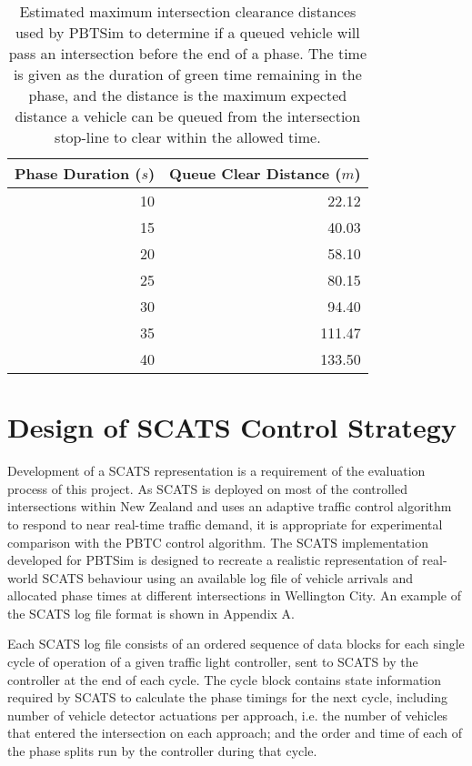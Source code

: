 \begin{table}[]
\begin{center}
\begin{tabular}{rr}
\toprule
Phase Duration ($s$) & Queue Clear Distance ($m$) \\
\midrule
10 & 22.12 \\
15 & 40.03 \\
20 & 58.10 \\
25 & 80.15 \\
30 & 94.40 \\
35 & 111.47 \\
40 & 133.50 \\
\bottomrule
\end{tabular}
\end{center}
\caption{ Estimated maximum intersection clearance distances used by PBTSim to determine if a queued vehicle will pass an intersection before the end of a phase. The time is given as the duration of green time remaining in the phase, and the distance is the maximum expected distance a vehicle can be queued from the intersection stop-line to clear within the allowed time. }
\label{vehiclecleardistances}
\end{table}

\section{Design of SCATS Control Strategy}
\label{sec:scats_strategy}

Development of a SCATS representation is a requirement of the evaluation process of this project. As SCATS is deployed on most of the controlled intersections within New Zealand and uses an adaptive traffic control algorithm to respond to near real-time traffic demand, it is appropriate for experimental comparison with the PBTC control algorithm. The SCATS implementation developed for PBTSim is designed to recreate a realistic representation of real-world SCATS behaviour using an available log file of vehicle arrivals and allocated phase times at different intersections in Wellington City. An example of the SCATS log file format is shown in Appendix A.

Each SCATS log file consists of an ordered sequence of data blocks for each single cycle of operation of a given traffic light controller, sent to SCATS by the controller at the end of each cycle. The cycle block contains state information required by SCATS to calculate the phase timings for the next cycle, including number of vehicle detector actuations per approach, i.e. the number of vehicles that entered the intersection on each approach; and the order and time of each of the phase splits run by the controller during that cycle. 

